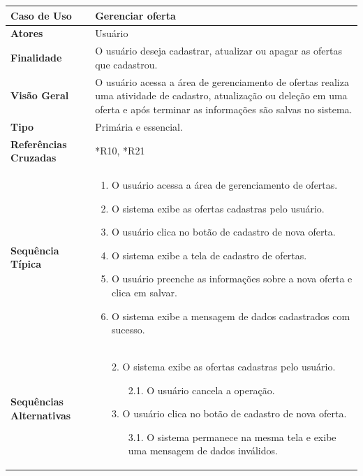 \documentclass[a4paper,11pt]{article}
\begin{document}
\begin{table}[H]
		\begin{tabularx}{\textwidth}{|l|X|}
		\hline
			\textbf{Caso de Uso} &  Gerenciar oferta \\ \hline
			\textbf{Atores} &  Usuário  \\ \hline
			\textbf{Finalidade} &  O usuário deseja cadastrar, atualizar ou apagar as ofertas que cadastrou. \\ \hline
			\textbf{Visão Geral} & O usuário acessa a área de gerenciamento de ofertas realiza uma atividade de cadastro, atualização ou deleção em uma oferta e após terminar as informações são salvas no sistema. \\ \hline
			\textbf{Tipo} & Primária e essencial. \\ \hline
			\textbf{Referências Cruzadas} & *R10, *R21 \\ \hline
			\textbf{Sequência Típica} & 
			\begin{enumerate}
			\item O usuário acessa a área de gerenciamento de ofertas.
			\item O sistema exibe as ofertas cadastras pelo usuário.
			\item O usuário clica no botão de cadastro de nova oferta.
			\item O sistema exibe a tela de cadastro de ofertas.
			\item O usuário preenche as informações sobre a nova oferta e clica em salvar.
			\item O sistema exibe a mensagem de dados cadastrados com sucesso.
			\end{enumerate} \\ \hline
			
			\textbf{Sequências Alternativas} & 
			\begin{itemize}
				\item[2.] O sistema exibe as ofertas cadastras pelo usuário.
				\begin{itemize}
					\item[2.1.] O usuário cancela a operação.
				\end{itemize}
				\item[3.] O usuário clica no botão de cadastro de nova oferta.			
				\begin{itemize}
					\item[3.1.] O sistema permanece na mesma tela e exibe uma mensagem de dados inválidos.
				\end{itemize}
			\end{itemize} \\ \hline
		\end{tabularx}
\end{table}
\end{document}
